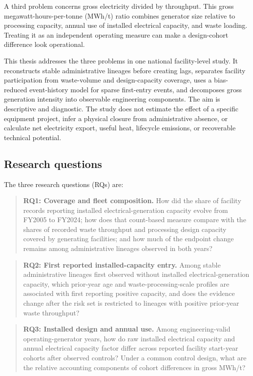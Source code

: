 \documentclass[12pt,a4paper]{article}
\begin{document}
A third problem concerns gross electricity divided by throughput. This gross
megawatt-hours-per-tonne (MWh/t) ratio combines generator size relative to
processing capacity, annual use of
installed electrical capacity, and waste loading. Treating it as an independent
operating measure can make a design-cohort difference look operational.

This thesis addresses the three problems in one national facility-level study.
It reconstructs stable administrative lineages before creating lags, separates
facility participation from waste-volume and design-capacity coverage, uses a
bias-reduced event-history model for sparse first-entry events, and decomposes
gross generation intensity into observable engineering components. The aim is
descriptive and diagnostic. The study does not estimate the effect of a
specific equipment project, infer a physical closure from administrative
absence, or calculate net electricity export, useful heat, lifecycle emissions,
or recoverable technical potential.

\subsection{Research questions}

The three research questions (RQs) are:

\begin{quote}
\textbf{RQ1: Coverage and fleet composition.} How did the share of facility
records reporting installed electrical-generation capacity evolve from FY2005
to FY2024; how does that count-based measure compare with the shares of recorded
waste throughput and processing design capacity covered by generating
facilities; and how much of the endpoint change remains among administrative
lineages observed in both years?
\end{quote}

\begin{quote}
\textbf{RQ2: First reported installed-capacity entry.} Among stable
administrative lineages first observed without installed electrical-generation
capacity, which prior-year age and waste-processing-scale profiles are
associated with first reporting positive capacity, and does the evidence change
after the risk set is restricted to lineages with positive prior-year waste
throughput?
\end{quote}

\begin{quote}
\textbf{RQ3: Installed design and annual use.} Among engineering-valid
operating-generator years, how do raw installed electrical capacity and annual
electrical capacity factor differ across reported facility start-year cohorts
after observed controls? Under a common control design, what are the relative
accounting components of cohort differences in gross MWh/t?
\end{quote}
\end{document}
